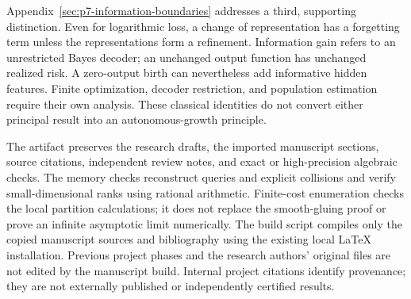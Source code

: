 \documentclass[11pt]{article}
\theoremstyle{remark}
\begin{document}
Appendix~\ref{sec:p7-information-boundaries} addresses a third,
supporting distinction. Even for logarithmic loss, a change of
representation has a forgetting term unless the representations
form a refinement. Information gain refers to an unrestricted
Bayes decoder; an unchanged output function has unchanged realized
risk. A zero-output birth can nevertheless add informative hidden
features. Finite optimization, decoder restriction, and population
estimation require their own analysis. These classical identities
do not convert either principal result into an autonomous-growth
principle.

The artifact preserves the research drafts, the imported manuscript
sections, source citations, independent review notes, and exact or
high-precision algebraic checks. The memory checks reconstruct
queries and explicit collisions and verify small-dimensional ranks
using rational arithmetic. Finite-cost enumeration checks the local
partition calculations; it does not replace the smooth-gluing proof
or prove an infinite asymptotic limit numerically. The build script
compiles only the copied manuscript sources and bibliography using
the existing local \LaTeX{} installation. Previous project phases
and the research authors' original files are not edited by the
manuscript build. Internal project citations identify provenance;
they are not externally published or independently certified results.

\appendix




\end{document}
